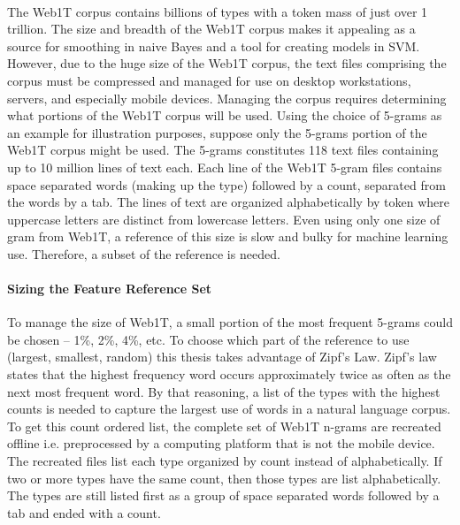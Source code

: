 	\paragraph*{}The Web1T corpus contains billions of types with a token mass of just over 1 trillion.  The size and breadth of the Web1T corpus makes it appealing as a source for smoothing in naive Bayes and a tool for creating models in SVM. However, due to the huge size of the Web1T corpus, the text files comprising the corpus must be compressed and managed for use on desktop workstations, servers, and especially mobile devices.  Managing the corpus requires determining what portions of the Web1T corpus will be used.  Using the choice of 5-grams as an example for illustration purposes, suppose only the 5-grams portion of the Web1T corpus might be used.  The 5-grams constitutes 118 text files containing up to 10 million lines of text each. Each line of the Web1T 5-gram files contains space separated words (making up the type) followed by a count, separated from the words by a tab.  The lines of text are organized alphabetically by token where uppercase letters are distinct from lowercase letters. Even using only one size of gram from Web1T, a reference of this size is slow and bulky for machine learning use.  Therefore, a subset of the reference is needed.
		\paragraph{Sizing the Feature Reference Set} To manage the size of Web1T, a small portion of the most frequent 5-grams could be chosen -- 1\%, 2\%, 4\%, etc.  To choose which part of the reference to use (largest, smallest, random) this thesis takes advantage of Zipf's Law.  Zipf's law states that the highest frequency word occurs approximately twice as often as the next most frequent word.  By that reasoning, a list of the types with the highest counts is needed to capture the largest use of words in a natural language corpus.  To get this count ordered list, the complete set of Web1T n-grams are recreated offline i.e. preprocessed by a computing platform that is not the mobile device.  The recreated files list each type organized by count instead of alphabetically.  If two or more types have the same count, then those types are list alphabetically.  The types are still listed first as a group of space separated words followed by a tab and ended with a count.

